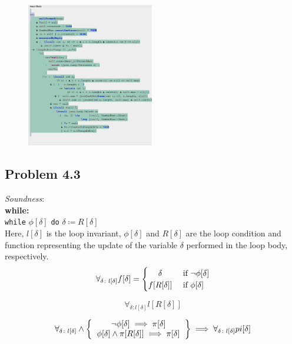 \documentclass[a4paper]{article}
\begin{document}
	\begin{figure}[h!]
		\centering
		\includegraphics[width=0.5\textwidth, scale=0.7]{425.png}
		\caption*{}
		\label{4}
	\end{figure}
	
	
	\newpage
	\subsection*{Problem 4.3} \textit{Soundness}: \\
	
	
	\textbf{while:} \\
	
	\texttt{while} $\phi [\delta]$ \texttt{do} $\delta \coloneqq R[\delta]$ \\
	
	Here, $l[\delta]$ is the loop invariant, $\phi[\delta]$ and $R[\delta]$ are the loop condition and function representing the update of the variable $\delta$ performed in the loop body, respectively.\\ 
	
	\begin{equation}
		\forall_{\delta \colon l[\delta]} f[\delta] = 
			\begin{cases} 
				\hfill \delta    \hfill & \text{ if $\neg \phi [\delta]$} \\
				\hfill f[R[\delta]] \hfill & \text{ if $\phi [\delta]$} \\
			\end{cases}
	\end{equation}
	
	\begin{equation}
		\forall_{\delta \colon l[\delta]} l[R[\delta]]
	\end{equation}
	
	\begin{equation}
		\forall_{\delta \colon l[\delta]} \wedge 
		\left \{
		\begin{tabular}{c}
		$\neg \phi [\delta] \implies \pi [\delta]$\\
		$\phi [\delta] \wedge \pi [R[\delta]] \implies \pi [\delta]$\\
		\end{tabular}
		\right \} \implies \forall_{\delta \colon l[\delta]} pi[\delta]
	\end{equation}
	
\end{document}
